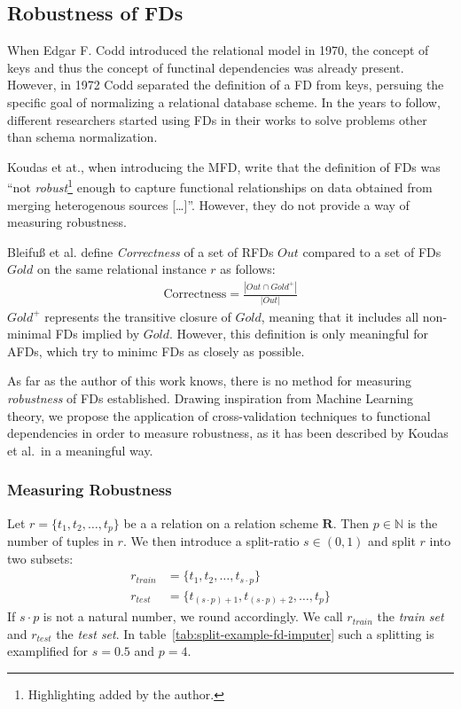\subsection{Robustness of FDs}
When Edgar F. Codd introduced the relational model in 1970, the concept of keys and thus the concept of functinal dependencies was already present.\cite[p.~70]{MAI83}
However, in 1972 Codd separated the definition of a FD from keys, persuing the specific goal of normalizing a relational database scheme.
In the years to follow, different researchers started using FDs in their works to solve problems other than schema normalization.

Koudas et at., when introducing the MFD, write that the definition of FDs was ``not \emph{robust}\footnote{Highlighting added by the author.} enough to capture functional relationships on data obtained from merging heterogenous sources [\dots]''.\cite[p.~1]{KOU09}
However, they do not provide a way of measuring robustness.

Bleifuß et al.\cite[p.~3]{BLE16} define \emph{Correctness} of a set of RFDs \( Out \) compared to a set of FDs \( Gold \) on the same relational instance \( r \) as follows:
\begin{align*}
    \text{Correctness} = \frac{|Out \cap Gold^{+}|}{|Out|}
\end{align*}
\( Gold^{+} \) represents the transitive closure of \( Gold \), meaning that it includes all non-minimal FDs implied by \( Gold \).
However, this definition is only meaningful for AFDs, which try to minimc FDs as closely as possible.

As far as the author of this work knows, there is no method for measuring \emph{robustness} of FDs established.
Drawing inspiration from Machine Learning theory, we propose the application of cross-validation techniques to functional dependencies in order to measure robustness, as it has been described by Koudas et al.\, in a meaningful way.

\subsubsection{Measuring Robustness}
Let \( r = \{ t_1, t_2, \dots, t_p \}\) be a a relation on a relation scheme \( \boldsymbol{R} \).
Then \( p \in \mathbb{N} \) is the number of tuples in \( r \).
We then introduce a split-ratio \( s \in (0, 1) \) and split \( r \) into two subsets:
\begin{align*}
    r_{train} &= \{ t_1, t_2, \dots, t_{s \cdot p} \} \\
    r_{test} &= \{ t_{(s \cdot p) + 1}, t_{(s \cdot p) + 2}, \dots, t_{p} \}
\end{align*}
If \( s \cdot p \) is not a natural number, we round accordingly.
We call \( r_{train} \) the \emph{train set} and \( r_{test} \) the \emph{test set}.
In table~\ref{tab:split-example-fd-imputer} such a splitting is examplified for \( s = 0.5 \) and \( p=4 \).


